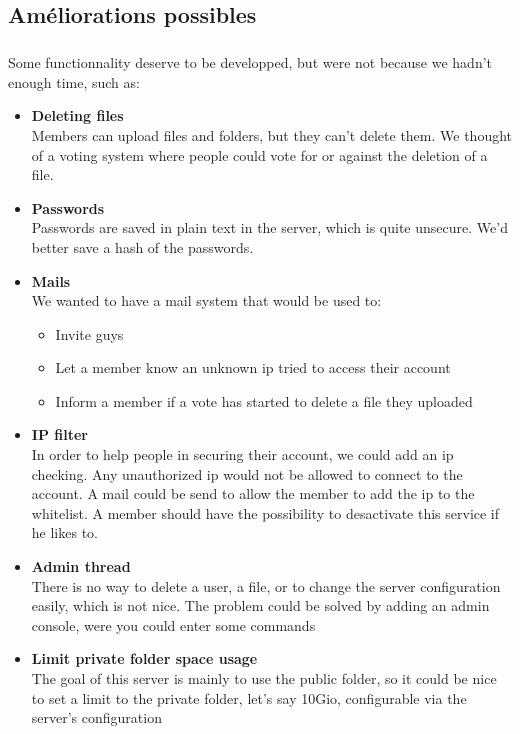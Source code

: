 \documentclass[12pt,a4paper,twoside]{article}
\begin{document}
		\subsection{Améliorations possibles} %
			\subparagraph*{}
				Some functionnality deserve to be developped, but were not because we hadn't enough time, such as:
				\begin{itemize}
					\item{} \textbf{Deleting files}\\
						Members can upload files and folders, but they can't delete them. We thought of a voting system where people could vote for or against the deletion of a file.
					\item{} \textbf{Passwords}\\
						Passwords are saved in plain text in the server, which is quite unsecure. We'd better save a hash of the passwords.
					\item{} \textbf{Mails}\\
						We wanted to have a mail system that would be used to:
						\begin{itemize}
							\item{} Invite guys
							\item{} Let a member know an unknown ip tried to access their account
							\item{} Inform a member if a vote has started to delete a file they uploaded
						\end{itemize}
					\item{} \textbf{IP filter}\\
						In order to help people in securing their account, we could add an ip checking. Any unauthorized ip would not be allowed to connect to the account. A mail could be send to allow the member to add the ip to the whitelist. A member should have the possibility to desactivate this service if he likes to.
					\item{} \textbf{Admin thread}\\
						There is no way to delete a user, a file, or to change the server configuration easily, which is not nice. The problem could be solved by adding an admin console, were you could enter some commands
					\item{} \textbf{Limit private folder space usage}\\
						The goal of this server is mainly to use the public folder, so it could be nice to set a limit to the private folder, let's say 10Gio, configurable via the server's configuration
				\end{itemize}
\end{document}
